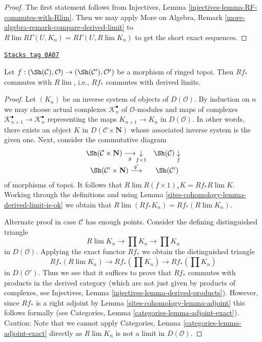 \begin{proof}
The first statement follows from
Injectives, Lemma \ref{injectives-lemma-RF-commutes-with-Rlim}.
Then we may apply
More on Algebra, Remark \ref{more-algebra-remark-compare-derived-limit}
to $R\lim R\Gamma(U, K_n) = R\Gamma(U, R\lim K_n)$ to get the short
exact sequences.
\end{proof}

\begin{lemma}
\label{sites-cohomology-lemma-Rf-commutes-with-Rlim}
\href{https://stacks.math.columbia.edu/tag/0A07}{\texttt{Stacks tag 0A07}}

Let $f : (\Sh(\mathcal{C}), \mathcal{O}) \to (\Sh(\mathcal{C}'), \mathcal{O}')$
be a morphism of ringed topoi. Then $Rf_*$ commutes with $R\lim$, i.e.,
$Rf_*$ commutes with derived limits.
\end{lemma}

\begin{proof}
Let $(K_n)$ be an inverse system of objects of $D(\mathcal{O})$.
By induction on $n$ we may choose actual complexes $\mathcal{K}_n^\bullet$
of $\mathcal{O}$-modules and maps of complexes
$\mathcal{K}_{n + 1}^\bullet \to \mathcal{K}_n^\bullet$ representing the
maps $K_{n + 1} \to K_n$ in $D(\mathcal{O})$. In other words, there exists
an object $K$ in $D(\mathcal{C} \times \mathbf{N})$ whose associated inverse
system is the given one. Next, consider the commutative diagram
$$
\begin{array}{cc}\Sh(\mathcal{C} \times \mathbf{N}) \underset{g}{\longrightarrow}\underset{f \times 1}{\downarrow} & \Sh(\mathcal{C}) \underset{f}{\downarrow} \\ \Sh(\mathcal{C}' \times \mathbf{N}) \overset{g'}{\longrightarrow} & \Sh(\mathcal{C}')\end{array}
$$
of morphisms of topoi. It follows that
$R\lim R(f \times 1)_*K = Rf_* R\lim K$. Working through the definitions
and using Lemma \ref{sites-cohomology-lemma-derived-limit-is-ok}
we obtain that $R\lim (Rf_*K_n) = Rf_*(R\lim K_n)$.

\medskip\noindent
Alternate proof in case $\mathcal{C}$ has enough points. Consider the defining
distinguished triangle
$$
R\lim K_n \to \prod K_n \to \prod K_n
$$
in $D(\mathcal{O})$. Applying the exact functor $Rf_*$ we obtain
the distinguished triangle
$$
Rf_*(R\lim K_n) \to Rf_*\left(\prod K_n\right) \to Rf_*\left(\prod K_n\right)
$$
in $D(\mathcal{O}')$. Thus we see that it suffices to prove that
$Rf_*$ commutes with products in the derived category (which are not just
given by products of complexes, see
Injectives, Lemma \ref{injectives-lemma-derived-products}).
However, since $Rf_*$ is a right adjoint by Lemma \ref{sites-cohomology-lemma-adjoint}
this follows formally (see
Categories, Lemma \ref{categories-lemma-adjoint-exact}).
Caution: Note that we cannot apply
Categories, Lemma \ref{categories-lemma-adjoint-exact}
directly as $R\lim K_n$ is not a limit in $D(\mathcal{O})$.
\end{proof}

